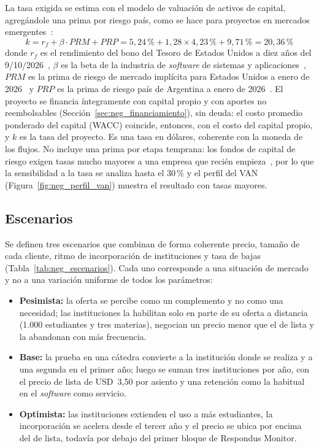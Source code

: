 La tasa exigida se estima con el modelo de valuación de activos de capital, agregándole una prima por riesgo país, como se hace para proyectos en mercados emergentes~\parencite{Damodaran2025ERP}:
\[
k = r_f + \beta \cdot PRM + PRP = 5{,}24\,\text{\%} + 1{,}28 \times 4{,}23\,\text{\%} + 9{,}71\,\text{\%} = 20{,}36\,\text{\%}
\]
donde $r_f$ es el rendimiento del bono del Tesoro de Estados Unidos a diez años del 9/10/2026~\parencite{USTreasury2026Yield}, $\beta$ es la beta de la industria de \textit{software} de sistemas y aplicaciones~\parencite{Damodaran2026WACC}, $PRM$ es la prima de riesgo de mercado implícita para Estados Unidos a enero de 2026~\parencite{Damodaran2026ERPImpl} y $PRP$ es la prima de riesgo país de Argentina a enero de 2026~\parencite{Damodaran2026CRP}. El proyecto se financia íntegramente con capital propio y con aportes no reembolsables (Sección~\ref{sec:neg_financiamiento}), sin deuda: el costo promedio ponderado del capital (WACC) coincide, entonces, con el costo del capital propio, y $k$ es la tasa del proyecto. Es una tasa en dólares, coherente con la moneda de los flujos. No incluye una prima por etapa temprana: los fondos de capital de riesgo exigen tasas mucho mayores a una empresa que recién empieza~\parencite{UADE2026ModeloNegocio}, por lo que la sensibilidad a la tasa se analiza hasta el 30\,\% y el perfil del VAN (Figura~\ref{fig:neg_perfil_van}) muestra el resultado con tasas mayores.

\subsection{Escenarios}

Se definen tres escenarios que combinan de forma coherente precio, tamaño de cada cliente, ritmo de incorporación de instituciones y tasa de bajas (Tabla~\ref{tab:neg_escenarios}). Cada uno corresponde a una situación de mercado y no a una variación uniforme de todos los parámetros:

\begin{itemize}
    \item \textbf{Pesimista:} la oferta se percibe como un complemento y no como una necesidad; las instituciones la habilitan solo en parte de su oferta a distancia (1.000 estudiantes y tres materias), negocian un precio menor que el de lista y la abandonan con más frecuencia.
    \item \textbf{Base:} la prueba en una cátedra convierte a la institución donde se realiza y a una segunda en el primer año; luego se suman tres instituciones por año, con el precio de lista de USD~3,50 por asiento y una retención como la habitual en el \textit{software} como servicio.
    \item \textbf{Optimista:} las instituciones extienden el uso a más estudiantes, la incorporación se acelera desde el tercer año y el precio se ubica por encima del de lista, todavía por debajo del primer bloque de Respondus Monitor.
\end{itemize}

